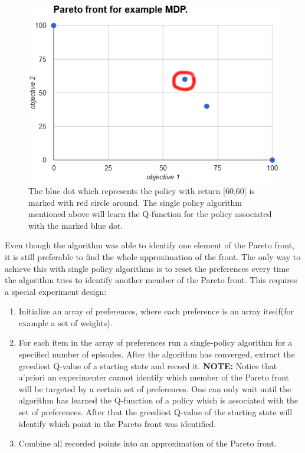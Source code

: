 \begin{figure}[ht]
\centering
\includegraphics[scale=0.6]{exampleMDPOneMarkedPolicy.png}
\caption{The blue dot which represents the policy with return [60,60] is marked with red circle around. The single policy algorithm mentioned above will learn the Q-function for the policy associated with the marked blue dot.}
\label{fig:exampleMDPOneMarkedPolicy}
\end{figure}

Even though the algorithm was able to identify one element of the Pareto front, it is still preferable to find the whole approximation of the front. The only way to achieve this with single policy algorithms is to reset the preferences every time the algorithm tries to identify another member of the Pareto front. This requires a special experiment design:

\begin{enumerate}
  \item Initialize an array of preferences, where each preference is an array itself(for example a set of weights).
  \item For each item in the array of preferences run a single-policy algorithm for a specified number of episodes. After the algorithm has converged, extract the greediest Q-value of a starting state and record it. \textbf{NOTE:} Notice that a'priori an experimenter cannot identify which member of the Pareto front will be targeted by a certain set of preferences. One can only wait until the algorithm has learned the Q-function of a policy which is associated with the set of preferences. After that the greediest Q-value of the starting state will identify which point in the Pareto front was identified.
  \item Combine all recorded points into an approximation of the Pareto front.
\end{enumerate}

